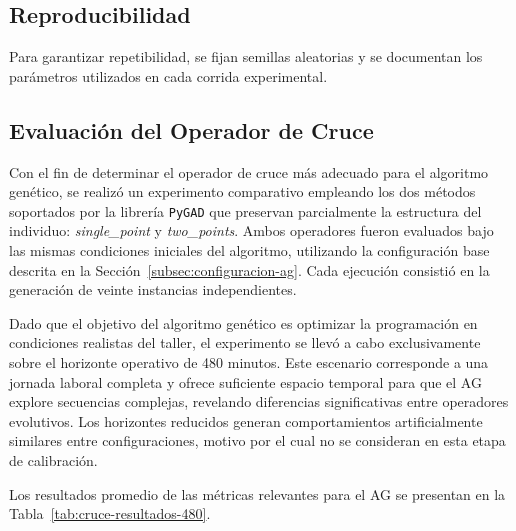 \subsection{Reproducibilidad}

Para garantizar repetibilidad, se fijan semillas aleatorias y se documentan los parámetros utilizados en cada corrida experimental.

\subsection{Evaluación del Operador de Cruce}
\label{subsec:cruce}

Con el fin de determinar el operador de cruce más adecuado para el algoritmo genético, se realizó un experimento comparativo empleando los dos métodos soportados por la librería \texttt{PyGAD} que preservan parcialmente la estructura del individuo: \textit{single\_point} y \textit{two\_points}. Ambos operadores fueron evaluados bajo las mismas condiciones iniciales del algoritmo, utilizando la configuración base descrita en la Sección~\ref{subsec:configuracion-ag}. Cada ejecución consistió en la generación de veinte instancias independientes.

Dado que el objetivo del algoritmo genético es optimizar la programación en condiciones realistas del taller, el experimento se llevó a cabo exclusivamente sobre el horizonte operativo de 480 minutos. Este escenario corresponde a una jornada laboral completa y ofrece suficiente espacio temporal para que el AG explore secuencias complejas, revelando diferencias significativas entre operadores evolutivos. Los horizontes reducidos generan comportamientos artificialmente similares entre configuraciones, motivo por el cual no se consideran en esta etapa de calibración.

Los resultados promedio de las métricas relevantes para el AG se presentan en la Tabla~\ref{tab:cruce-resultados-480}.

\begin{table}[htbp]
\centering
\small
\caption{Resultados promedio del AG para cada operador de cruce (480 minutos).}
\label{tab:cruce-resultados-480}
\end{table}


